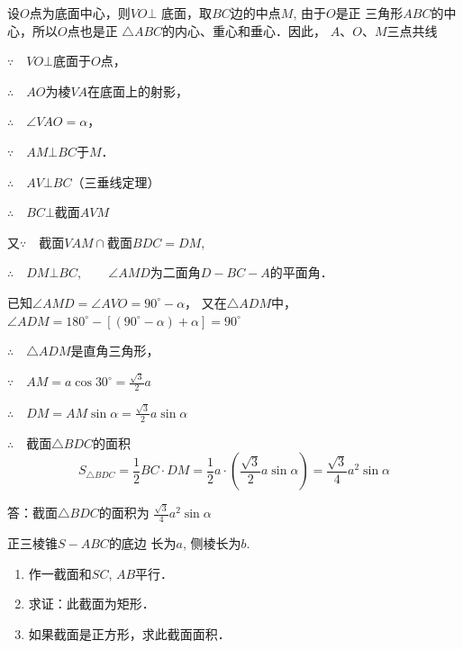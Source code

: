 \begin{solution}
    设$O$点为底面中心，则$VO\bot$
底面，取$BC$边的中点$M$, 由于$O$是正
三角形$ABC$的中心，所以$O$点也是正
$\triangle ABC$的内心、重心和垂心．因此，
$A$、$O$、$M$三点共线

$\because\quad VO\bot$底面于$O$点，

$\therefore\quad AO$为棱$VA$在底面上的射影，

$\therefore\quad \angle VAO=\alpha$，

$\because\quad AM\bot BC$于$M$．

$\therefore\quad AV\bot BC$\qquad （三垂线定理）

$\therefore\quad BC\bot$截面$AVM$

又$\because\quad $截面$VAM\cap$截面$BDC=DM$, 

$\therefore\quad DM\bot BC,\qquad \angle AMD$为二面角$D-BC-A$的平面角．

已知$\angle AMD=\angle AVO=90^{\circ}-\alpha$，
又在$\triangle ADM$中，$\angle ADM=180^{\circ}-[(90^{\circ}-\alpha)+\alpha]=90^{\circ}$

$\therefore\quad \triangle ADM$是直角三角形，

$\because\quad AM=a\cos 30^{\circ}=\frac{\sqrt{3}}{2}a$

$\therefore\quad DM=AM\sin\alpha=\frac{\sqrt{3}}{2}a\sin\alpha$

$\therefore\quad $截面$\triangle BDC$的面积
\[S_{\triangle BDC}=\frac{1}{2}BC\cdot DM=\frac{1}{2}a\cdot \left(\frac{\sqrt{3}}{2}a\sin\alpha\right)=\frac{\sqrt{3}}{4}a^2\sin\alpha\]

答：截面$\triangle BDC$的面积为
$\frac{\sqrt{3}}{4}a^2\sin\alpha$
\end{solution}

\begin{example}
    正三棱锥$S-ABC$的底边
    长为$a$, 侧棱长为$b$. 
    
\begin{enumerate}
\item 作一截面和$SC$, $AB$平行．
    \item 求证：此截面为矩形．
    \item 如果截面是正方形，求此截面面积．
\end{enumerate}
\end{example}


\begin{figure}[htp]
    \centering
{}
    \caption{}
\end{figure}

